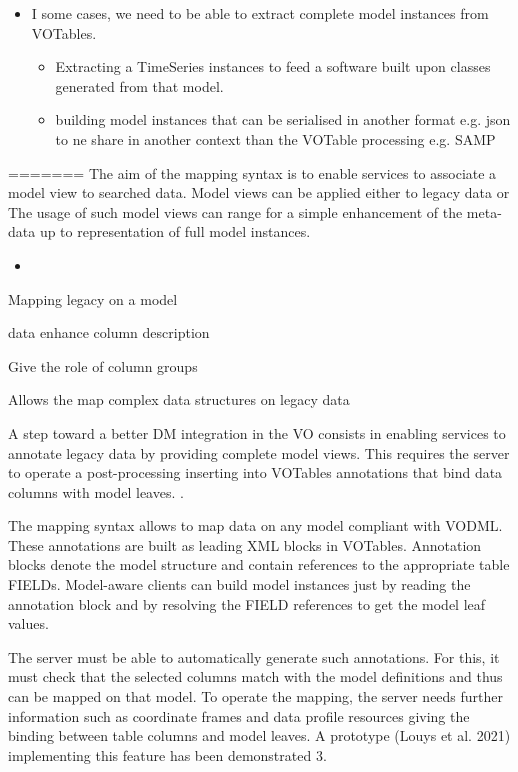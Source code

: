\begin{itemize}
  \item I some cases, we need to be able to extract complete model instances from VOTables.
    \begin{itemize}
      \item Extracting a TimeSeries instances to feed a software built upon classes generated from that model.
      \item building model instances that can be serialised in another format e.g. json to ne share in another context than the VOTable processing e.g. SAMP
   \end{itemize}          
    
\end{itemize} 

=======
The aim of the mapping syntax is to enable services to associate a model view to searched data.
Model views can be applied either to legacy data or 
The usage of such model views can range for a simple enhancement of the meta-data up to representation of full model instances.
\begin{itemize}
  \item 
\end{itemize} 


Mapping legacy on a model

data enhance column description

Give the role of column groups

Allows the map complex data structures on legacy data


A step toward a better DM integration in the VO consists in enabling services to annotate
legacy data by providing complete model
views. This requires the server to operate a post-processing inserting into VOTables
annotations that bind data columns with model leaves. .

The mapping syntax allows to map data on any model compliant with VODML. 
These annotations are built as leading XML blocks in VOTables. 
Annotation blocks denote the model structure and contain references to the appropriate table
FIELDs. Model-aware clients can build model instances just by reading the annotation
block and by resolving the FIELD references to get the model leaf values. 

The server must be able to automatically generate such annotations. For this, it
must check that the selected columns match with the model definitions and thus can be
mapped on that model. To operate the mapping, the server needs further information
such as coordinate frames and data profile resources giving the binding between table
columns and model leaves. A prototype (Louys et al. 2021) implementing this feature
has been demonstrated 3.


